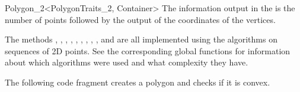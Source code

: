 \begin{ccRefClass}{Polygon_2<PolygonTraits_2, Container>}
The information output in the  is the number of points
followed by the output of the coordinates of the vertices.



\ccImplementation

The methods
,
,
,
,
,
,
,
,
,
 and
are all implemented using the algorithms on sequences of 2D points.
See the corresponding global functions for information about which algorithms
were used and what complexity they have.

\ccExample

The following code fragment creates a polygon and checks if it is convex.



\end{ccRefClass}
